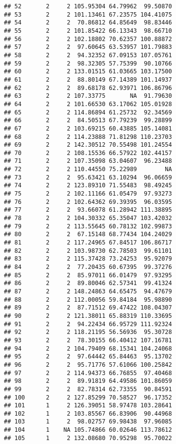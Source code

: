 \documentclass[
]{article}
\begin{document}
\begin{verbatim}
## 52       2     2 105.95304 64.79962  99.50870
## 53       2     2 101.13461 67.23575 104.41075
## 54       2     2  70.86812 64.85649  98.83446
## 55       2     2 101.85422 66.13343  98.66710
## 56       2     2 102.18802 70.62357 100.88872
## 57       2     2  97.60645 63.53957 101.79883
## 58       2     2  94.32352 67.09153 107.05761
## 59       2     2  98.32305 57.75399  90.10766
## 60       2     2 133.01515 61.03665 103.17500
## 61       2     2  88.80149 67.14389 101.14937
## 62       2     2  89.68178 62.93971 106.86796
## 63       2     2 107.33775       NA  91.79630
## 64       2     2 101.66530 63.17062 105.01928
## 65       2     2 114.86894 61.25732  92.34569
## 66       2     2  84.50513 67.79239  99.28899
## 67       2     2 103.69215 60.43885 105.14081
## 68       2     2 114.23888 71.81298 110.23703
## 69       2     2 142.30512 70.55498 101.24554
## 70       2     2 108.15536 66.57922 102.44157
## 71       2     2 107.35098 63.04607  96.23488
## 72       2     2 110.44550 75.22989        NA
## 73       2     2  95.63421 63.10294  96.06659
## 74       2     2 123.89310 71.55483  98.49245
## 75       2     2 102.11166 61.05479  97.93273
## 76       2     2 102.64362 69.39395  96.03595
## 77       2     2  93.66078 61.28942 111.38895
## 78       2     2 104.30332 65.35047 103.42032
## 79       2     2 113.55645 60.78132 102.99873
## 80       2     2  67.15148 68.77434 104.24029
## 81       2     2 117.24965 67.84517 106.86717
## 82       2     2 103.98730 62.78503  99.61101
## 83       2     2 115.37428 73.24253  95.92079
## 84       2     2  77.20435 60.67395  99.37276
## 85       2     2  85.97011 66.01479  97.93295
## 86       2     2  89.80046 62.57341  99.41324
## 87       2     2 148.24863 64.65475  94.47679
## 88       2     2 112.00056 59.84184  95.98890
## 89       2     2  87.71512 69.47422 108.04307
## 90       2     2 121.38011 65.88319 110.33695
## 91       2     2  94.22434 66.95729 111.92324
## 92       2     2 118.21195 56.56936  95.30728
## 93       2     2  78.30155 66.40412 107.16781
## 94       2     2 104.79409 68.15341 104.24068
## 95       2     2  97.64442 65.84463  95.13702
## 96       2     2  95.71776 57.61066 100.25842
## 97       2     2 114.94373 66.76855  97.40468
## 98       2     2  89.91819 64.49586 101.86059
## 99       2     2  82.78314 62.73355  90.84591
## 100      2     2 127.85299 70.58527  96.17352
## 101      1     2 126.39051 58.97478 103.28641
## 102      1     2 103.85567 66.83906  90.44968
## 103      1     2  98.02757 69.98438  97.96085
## 104      1    NA 105.74866 60.02646 113.78612
## 105      1     2 132.08680 70.95298  95.70022

\end{verbatim}
\end{document}
